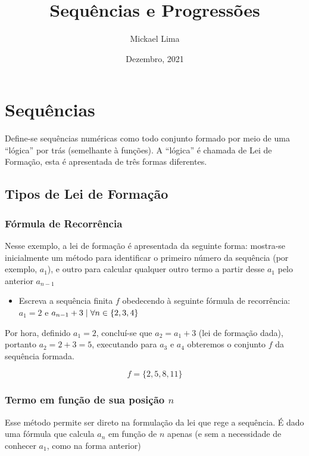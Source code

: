 \documentclass[11pt]{article}
\title{Sequências e Progressões}
\author{Mickael Lima}
\date{Dezembro, 2021}
\begin{document}
\maketitle
\pagebreak
\tableofcontents
\pagebreak

\section{Sequências}

Define-se sequências numéricas como todo conjunto formado por meio de uma ``lógica'' por trás (semelhante à funções). A ``lógica'' é chamada de Lei de Formação, esta é apresentada de três formas diferentes.

\subsection{Tipos de Lei de Formação}

\subsubsection{Fórmula de Recorrência}

Nesse exemplo, a lei de formação é apresentada da seguinte forma: mostra-se inicialmente um método para identificar o primeiro número da sequência (por exemplo, $a_{1}$), e outro para calcular qualquer outro termo a partir desse $a_{1}$ pelo anterior $a_{n - 1}$

\begin{itemize}

  \item Escreva a sequência finita $f$ obedecendo à seguinte fórmula de recorrência: $a_{1} = 2$ e $a_{n - 1} + 3 \hspace{0.1cm} | \hspace{0.1cm} \forall n \in \{2, 3, 4\}$
\end{itemize}

Por hora, definido $a_{1} = 2$, concluí-se que $a_{2} = a_{1} + 3$ (lei de formação dada), portanto $a_{2} = 2 + 3 = 5$, executando para $a_{3}$ e $a_{4}$ obteremos o conjunto $f$ da sequência formada.

\[f = \{2, 5, 8, 11\}\]

\subsubsection{Termo em função de sua posição $n$}

Esse método permite ser direto na formulação da lei que rege a sequência. É dado uma fórmula que calcula $a_{n}$ em função de $n$ apenas (e sem a necessidade de conhecer $a_{1}$, como na forma anterior)
\end{document}
